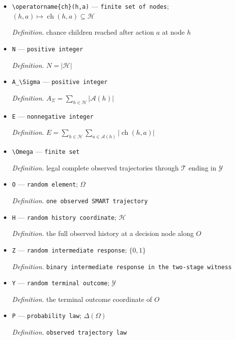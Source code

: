 \documentclass{article}
\begin{document}
\begin{itemize}
  \item \texttt{\textbackslash{}\allowbreak{}operatorname\{ch\}\allowbreak{}(h,\allowbreak{}a)} --- \texttt{finite set of nodes}; \((h,a)\mapsto\operatorname{ch}(h,a)\subseteq\mathcal H\)
  \par\smallskip\noindent\emph{Definition.} chance children reached after action \(a\) at node \(h\)
  \item \texttt{N} --- \texttt{positive integer}
  \par\smallskip\noindent\emph{Definition.} \(N=\lvert\mathcal H\rvert\)
  \item \texttt{A\_\allowbreak{}\textbackslash{}\allowbreak{}Sigma} --- \texttt{positive integer}
  \par\smallskip\noindent\emph{Definition.} \(A_\Sigma=\sum_{h\in\mathcal H}\lvert\mathcal A(h)\rvert\)
  \item \texttt{E} --- \texttt{nonnegative integer}
  \par\smallskip\noindent\emph{Definition.} \(E=\sum_{h\in\mathcal H}\sum_{a\in\mathcal A(h)}\lvert\operatorname{ch}(h,a)\rvert\)
  \item \texttt{\textbackslash{}\allowbreak{}Omega} --- \texttt{finite set}
  \par\smallskip\noindent\emph{Definition.} legal complete observed trajectories through \(\mathcal T\) ending in \(\mathcal Y\)
  \item \texttt{O} --- \texttt{random element}; \(\Omega\)
  \par\smallskip\noindent\emph{Definition.} \texttt{one observed SMART trajectory}
  \item \texttt{H} --- \texttt{random history coordinate}; \(\mathcal H\)
  \par\smallskip\noindent\emph{Definition.} the full observed history at a decision node along \(O\)
  \item \texttt{Z} --- \texttt{random intermediate response}; \(\{0,1\}\)
  \par\smallskip\noindent\emph{Definition.} \texttt{binary intermediate response in the two-\allowbreak{}stage witness}
  \item \texttt{Y} --- \texttt{random terminal outcome}; \(\mathcal Y\)
  \par\smallskip\noindent\emph{Definition.} the terminal outcome coordinate of \(O\)
  \item \texttt{P} --- \texttt{probability law}; \(\Delta(\Omega)\)
  \par\smallskip\noindent\emph{Definition.} \texttt{observed trajectory law}

\end{itemize}
\end{document}
